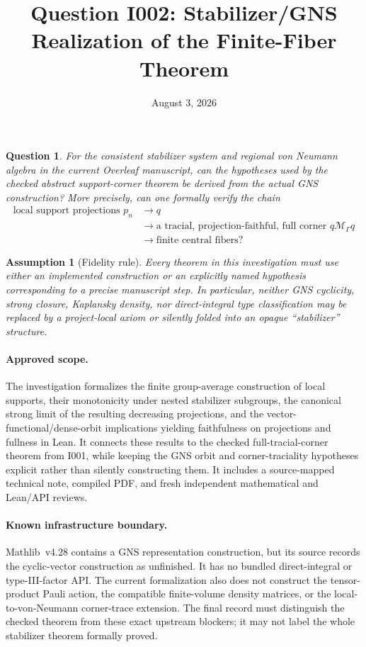 \documentclass[11pt,reqno]{amsart}
\title{Question I002: Stabilizer/GNS Realization of the Finite-Fiber Theorem}
\date{August 3, 2026}
\newtheorem{question}{Question}
\newtheorem{assumption}{Assumption}
\newcommand{\cM}{\mathcal M}
\newcommand{\G}{\Gamma}
\begin{document}
\maketitle

\begin{question}
For the consistent stabilizer system and regional von Neumann algebra in the
current Overleaf manuscript, can the hypotheses used by the checked abstract
support-corner theorem be derived from the actual GNS construction?  More
precisely, can one formally verify the chain
\begin{equation}
  \begin{aligned}
    \text{local support projections }p_n
    &\longrightarrow q \\
    &\longrightarrow \text{a tracial, projection-faithful, full corner }q\cM_\G q \\
    &\longrightarrow \text{finite central fibers}?
  \end{aligned}
  \label{eq:question_chain}
\end{equation}
\end{question}

\begin{assumption}[Fidelity rule]
Every theorem in this investigation must use either an implemented
construction or an explicitly named hypothesis corresponding to a precise
manuscript step.  In particular, neither GNS cyclicity, strong closure,
Kaplansky density, nor direct-integral type classification may be replaced by
a project-local axiom or silently folded into an opaque ``stabilizer''
structure.
\end{assumption}

\paragraph{Approved scope.}
The investigation formalizes the finite group-average construction of local
supports, their monotonicity under nested stabilizer subgroups, the canonical
strong limit of the resulting decreasing projections, and the
vector-functional/dense-orbit implications yielding faithfulness on
projections and fullness in Lean.  It connects these results to the checked
full-tracial-corner theorem from I001, while keeping the GNS orbit and
corner-traciality hypotheses explicit rather than silently constructing them.
It includes a source-mapped technical note, compiled PDF, and fresh
independent mathematical and Lean/API reviews.

\paragraph{Known infrastructure boundary.}
Mathlib~v4.28 contains a GNS representation construction, but its source
records the cyclic-vector construction as unfinished.  It has no bundled
direct-integral or type-III-factor API.  The current formalization also does
not construct the tensor-product Pauli action, the compatible finite-volume
density matrices, or the local-to-von-Neumann corner-trace extension.  The
final record must distinguish the checked theorem from these exact upstream
blockers; it may not label the whole stabilizer theorem formally proved.
\end{document}
